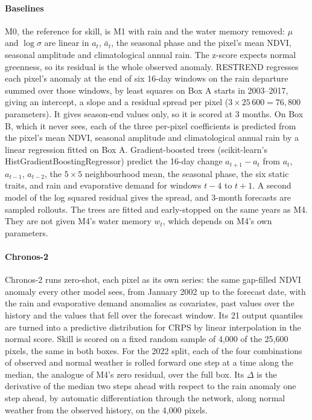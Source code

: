 \documentclass[letterpaper]{article} %
\begin{document}
\paragraph{Baselines} M0, the reference for skill, is M1 with rain and the water memory removed: $\mu$ and $\log\sigma$ are linear in $a_t$, $\bar a_t$, the seasonal phase and the pixel's mean NDVI, seasonal amplitude and climatological annual rain. The z-score expects normal greenness, so its residual is the whole observed anomaly. RESTREND regresses each pixel's anomaly at the end of six 16-day windows on the rain departure summed over those windows, by least squares on Box A starts in 2003--2017, giving an intercept, a slope and a residual spread per pixel ($3\times25\,600=76{,}800$ parameters). It gives season-end values only, so it is scored at 3 months. On Box B, which it never sees, each of the three per-pixel coefficients is predicted from the pixel's mean NDVI, seasonal amplitude and climatological annual rain by a linear regression fitted on Box A. Gradient-boosted trees \citep{friedman2001} (scikit-learn's HistGradientBoostingRegressor) predict the 16-day change $a_{t+1}-a_t$ from $a_t$, $a_{t-1}$, $a_{t-2}$, the $5\times5$ neighbourhood mean, the seasonal phase, the six static traits, and rain and evaporative demand for windows $t-4$ to $t+1$. A second model of the log squared residual gives the spread, and 3-month forecasts are sampled rollouts. The trees are fitted and early-stopped on the same years as M4. They are not given M4's water memory $w_t$, which depends on M4's own parameters.

\paragraph{Chronos-2} Chronos-2 \citep{chronos2} runs zero-shot, each pixel as its own series: the same gap-filled NDVI anomaly every other model sees, from January 2002 up to the forecast date, with the rain and evaporative demand anomalies as covariates, past values over the history and the values that fell over the forecast window. Its 21 output quantiles are turned into a predictive distribution for CRPS by linear interpolation in the normal score. Skill is scored on a fixed random sample of 4,000 of the 25,600 pixels, the same in both boxes. For the 2022 split, each of the four combinations of observed and normal weather is rolled forward one step at a time along the median, the analogue of M4's zero residual, over the full box. Its $\Delta$ is the derivative of the median two steps ahead with respect to the rain anomaly one step ahead, by automatic differentiation through the network, along normal weather from the observed history, on the 4,000 pixels.
\end{document}
